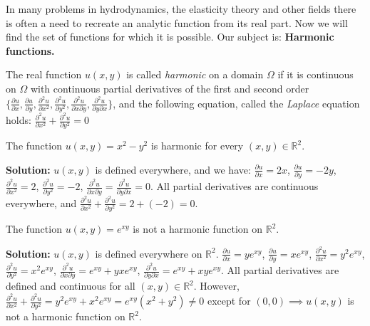 \documentclass[12pt]{article}
\begin{document}
In many problems in hydrodynamics, the elasticity theory and other fields there is often a need to recreate an analytic function from its real part. Now we will find the set of functions for which it is possible. Our subject is:
\textbf{Harmonic functions.}

\begin{definition}
The real function $u(x,y)$ is called \emph{harmonic} on a domain $\Omega$ if it is continuous on $\Omega$ with continuous partial derivatives of the first and second order $\{\frac{\partial u}{\partial x}, \frac{\partial u}{\partial y}, \frac{\partial^2 u}{\partial x^2}, \frac{\partial^2 u}{\partial y^2}, \frac{\partial^2 u}{\partial x \partial y}, \frac{\partial^2 u}{\partial y \partial x}\}$, and the following equation, called the \emph{Laplace} equation holds:
$\frac{\partial^2 u}{\partial x^2} + \frac{\partial^2 u}{\partial y^2} = 0$
\end{definition}

\begin{example}
The function $u(x,y) = x^2 - y^2$ is harmonic for every $(x,y) \in \mathbb{R}^2$.

\textbf{Solution:} $u(x,y)$ is defined everywhere, and we have:
$\frac{\partial u}{\partial x} = 2x$, $\frac{\partial u}{\partial y} = -2y$, $\frac{\partial^2 u}{\partial x^2} = 2$, $\frac{\partial^2 u}{\partial y^2} = -2$, $\frac{\partial^2 u}{\partial x \partial y} = \frac{\partial^2 u}{\partial y \partial x} = 0$.
All partial derivatives are continuous everywhere, and $\frac{\partial^2 u}{\partial x^2} + \frac{\partial^2 u}{\partial y^2} = 2 + (-2) = 0$.
\end{example}

\begin{example}
The function $u(x,y) = e^{xy}$ is not a harmonic function on $\mathbb{R}^2$.

\textbf{Solution:} $u(x,y)$ is defined everywhere on $\mathbb{R}^2$.
$\frac{\partial u}{\partial x} = ye^{xy}$, $\frac{\partial u}{\partial y} = xe^{xy}$, $\frac{\partial^2 u}{\partial x^2} = y^2e^{xy}$, $\frac{\partial^2 u}{\partial y^2} = x^2e^{xy}$,
$\frac{\partial^2 u}{\partial x \partial y} = e^{xy} + yxe^{xy}$, $\frac{\partial^2 u}{\partial y \partial x} = e^{xy} + xy e^{xy}$.
All partial derivatives are defined and continuous for all $(x,y) \in \mathbb{R}^2$. However,
$\frac{\partial^2 u}{\partial x^2} + \frac{\partial^2 u}{\partial y^2} = y^2e^{xy} + x^2e^{xy} = e^{xy}(x^2 + y^2) \neq 0$ except for $(0,0) \implies u(x,y)$ is not a harmonic function on $\mathbb{R}^2$.
\end{example}
\end{document}
